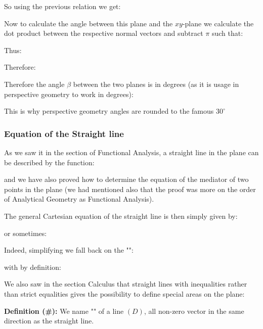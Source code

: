 	So using the previous relation we get:
	
	Now to calculate the angle between this plane and the $xy$-plane we calculate the dot product between the respective normal vectors and subtract $\pi$ such that:
	
	Thus:
	
	 Therefore:
	
	 Therefore the angle $\beta$ between the two planes is in degrees (as it is usage in perspective geometry to work in degrees):
	 
	 This is why perspective geometry angles are rounded to the famous $30^\circ$
	
	\pagebreak	
	\subsubsection{Equation of the Straight line}\label{equation of the straight line}
	As we saw it in the section of Functional Analysis, a straight line in the plane can be described by the function:
	
	and we have also proved how to determine the equation of the mediator of two points in the plane (we had mentioned also that the proof was more on the order of Analytical Geometry as Functional Analysis).
	
	The general Cartesian equation of the straight line is then simply given by:
	
	or sometimes:
	
	Indeed, simplifying we fall back on the "":
	
	with by definition:
	
	We also saw in the section Calculus that straight lines with inequalities rather than strict equalities gives the possibility to define special areas on the plane:
	\begin{center}
	\end{center}
	\textbf{Definition (\#\mydef):} We name "" of a line $(D)$, all non-zero vector in the same direction as the straight line.
	
